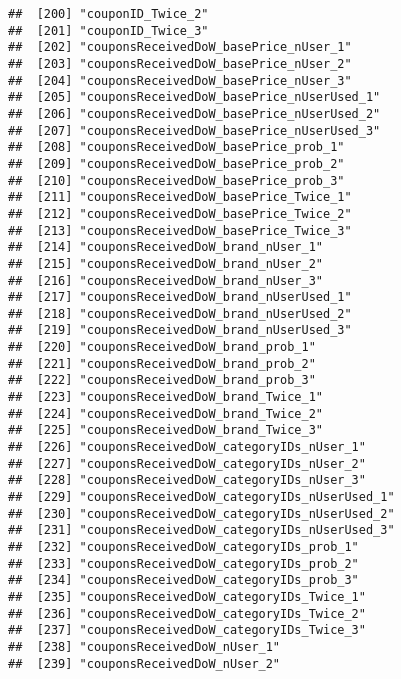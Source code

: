 \documentclass[10pt]{report}
\begin{document}
\begin{verbatim}
##  [200] "couponID_Twice_2"                                     
##  [201] "couponID_Twice_3"                                     
##  [202] "couponsReceivedDoW_basePrice_nUser_1"                 
##  [203] "couponsReceivedDoW_basePrice_nUser_2"                 
##  [204] "couponsReceivedDoW_basePrice_nUser_3"                 
##  [205] "couponsReceivedDoW_basePrice_nUserUsed_1"             
##  [206] "couponsReceivedDoW_basePrice_nUserUsed_2"             
##  [207] "couponsReceivedDoW_basePrice_nUserUsed_3"             
##  [208] "couponsReceivedDoW_basePrice_prob_1"                  
##  [209] "couponsReceivedDoW_basePrice_prob_2"                  
##  [210] "couponsReceivedDoW_basePrice_prob_3"                  
##  [211] "couponsReceivedDoW_basePrice_Twice_1"                 
##  [212] "couponsReceivedDoW_basePrice_Twice_2"                 
##  [213] "couponsReceivedDoW_basePrice_Twice_3"                 
##  [214] "couponsReceivedDoW_brand_nUser_1"                     
##  [215] "couponsReceivedDoW_brand_nUser_2"                     
##  [216] "couponsReceivedDoW_brand_nUser_3"                     
##  [217] "couponsReceivedDoW_brand_nUserUsed_1"                 
##  [218] "couponsReceivedDoW_brand_nUserUsed_2"                 
##  [219] "couponsReceivedDoW_brand_nUserUsed_3"                 
##  [220] "couponsReceivedDoW_brand_prob_1"                      
##  [221] "couponsReceivedDoW_brand_prob_2"                      
##  [222] "couponsReceivedDoW_brand_prob_3"                      
##  [223] "couponsReceivedDoW_brand_Twice_1"                     
##  [224] "couponsReceivedDoW_brand_Twice_2"                     
##  [225] "couponsReceivedDoW_brand_Twice_3"                     
##  [226] "couponsReceivedDoW_categoryIDs_nUser_1"               
##  [227] "couponsReceivedDoW_categoryIDs_nUser_2"               
##  [228] "couponsReceivedDoW_categoryIDs_nUser_3"               
##  [229] "couponsReceivedDoW_categoryIDs_nUserUsed_1"           
##  [230] "couponsReceivedDoW_categoryIDs_nUserUsed_2"           
##  [231] "couponsReceivedDoW_categoryIDs_nUserUsed_3"           
##  [232] "couponsReceivedDoW_categoryIDs_prob_1"                
##  [233] "couponsReceivedDoW_categoryIDs_prob_2"                
##  [234] "couponsReceivedDoW_categoryIDs_prob_3"                
##  [235] "couponsReceivedDoW_categoryIDs_Twice_1"               
##  [236] "couponsReceivedDoW_categoryIDs_Twice_2"               
##  [237] "couponsReceivedDoW_categoryIDs_Twice_3"               
##  [238] "couponsReceivedDoW_nUser_1"                           
##  [239] "couponsReceivedDoW_nUser_2"                           

\end{verbatim}
\end{document}
